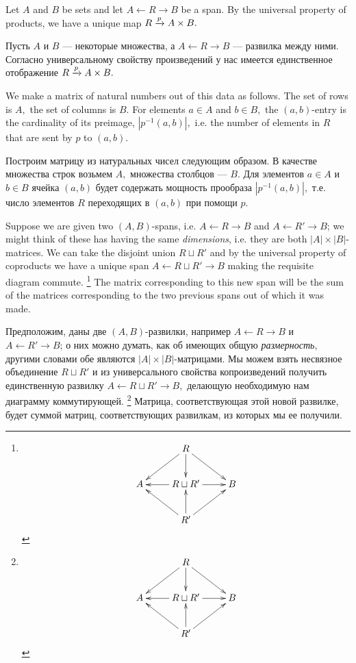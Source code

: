 \documentclass[../main/CT4S-EN-RU]{subfiles}
\begin{document}
\begin{blockENG}
Let $A$ and $B$ be sets and let $A{←} R{→} B$ be a span. By the universal property of products, we have a unique map $R\xrightarrow{p}A\times B.$ 
\end{blockENG}

\begin{blockRUS}
Пусть $A$ и $B$ — некоторые множества, а $A{←} R{→} B$ — развилка между ними. Согласно универсальному свойству произведений у нас имеется единственное отображение $R\xrightarrow{p}A\times B.$ 
\end{blockRUS}

\begin{blockENG}
We make a matrix of natural numbers out of this data as follows. The set of rows is $A,$ the set of columns is $B.$ For elements $a\in A$ and $b\in B,$ the $(a,b)$-entry is the cardinality of its preimage, $|p^{-1}(a,b)|,$ i.e. the number of elements in $R$ that are sent by $p$ to $(a,b).$ 
\end{blockENG}

\begin{blockRUS}
Построим матрицу из натуральных чисел следующим образом. В качестве множества строк возьмем $A,$ множества столбцов — $B.$ Для элементов $a\in A$ и $b\in B$ ячейка $(a,b)$ будет содержать мощность прообраза $|p^{-1}(a,b)|,$ т.е. число элементов $R$ переходящих в $(a,b)$ при помощи $p.$ 
\end{blockRUS}

\begin{blockENG}
Suppose we are given two $(A,B)$-spans, i.e. $A{←} R{→} B$ and $A{←} R'{→} B$; we might think of these has having the same {\em dimensions}, i.e. they are both $|A|\times|B|$-matrices. We can take the disjoint union $R\sqcup R'$ and by the universal property of coproducts we have a unique span $A{←} R\sqcup R'{→} B$ making the requisite diagram commute.%
\footnote{
$$\xymatrix{
&R\ar[dl]\ar[dr]\ar[d]\\
A&R\sqcup R'\ar[l]\ar[r]&B\\
&R'\ar[ur]\ar[ul]\ar[u]}
$$
}
The matrix corresponding to this new span will be the sum of the matrices corresponding to the two previous spans out of which it was made.
\end{blockENG}

\begin{blockRUS}
Предположим, даны две $(A,B)$-развилки, например $A{←} R{→} B$ и $A{←} R'{→} B$; о них можно думать, как об имеющих общую {\em размерность}, другими словами обе являются $|A|\times|B|$-матрицами. Мы можем взять несвязное объединение $R\sqcup R'$ и из универсального свойства копроизведений получить единственную развилку $A{←} R\sqcup R'{→} B,$ делающую необходимую нам диаграмму коммутирующей.%
\footnote{
$$\xymatrix{
&R\ar[dl]\ar[dr]\ar[d]\\
A&R\sqcup R'\ar[l]\ar[r]&B\\
&R'\ar[ur]\ar[ul]\ar[u]}
$$
}
Матрица, соответствующая этой новой развилке, будет суммой матриц, соответствующих развилкам, из которых мы ее получили.
\end{blockRUS}
\end{document}
